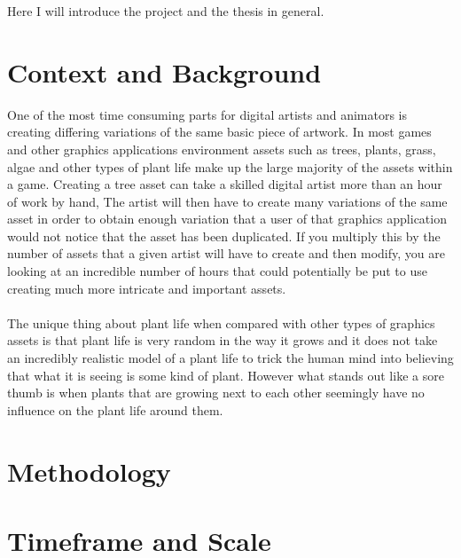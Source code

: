 Here I will introduce the project and the thesis in general.\\

\section{Context and Background}
One of the most time consuming parts for digital artists and animators is creating differing variations of the same basic piece of artwork. In most games and other graphics applications environment assets such as trees, plants, grass, algae and other types of plant life make up the large majority of the assets within a game. Creating a tree asset can take a skilled digital artist more than an hour of work by hand, The artist will then have to create many variations of the same asset in order to obtain enough variation that a user of that graphics application would not notice that the asset has been duplicated. If you multiply this by the number of assets that a given artist will have to create and then modify, you are looking at an incredible number of hours that could potentially be put to use creating much more intricate and important assets.\\
\\
The unique thing about plant life when compared with other types of graphics assets is that plant life is very random in the way it grows and it does not take an incredibly realistic model of a plant life to trick the human mind into believing that what it is seeing is some kind of plant. However what stands out like a sore thumb is when plants that are growing next to each other seemingly have no influence on the plant life around them.\\

\section{Methodology}

\section{Timeframe and Scale}


